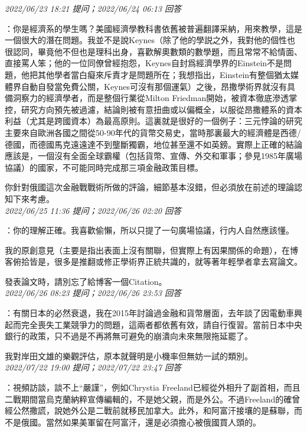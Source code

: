 \documentclass[twocolumn]{ctexart}
\begin{document}
\textit{\hfill\noindent\small 2022/06/23 18:21 提问；2022/06/24 06:13 回答}

：你是經濟系的學生嗎？美國經濟學教科書依舊被普遍翻譯采納，用來教學，這是一個很大的潛在問題。我並不是說Keynes（除了他的學説之外，我對他的個性也很認同，畢竟他不但也是理科出身，喜歡解奧數類的數學題，而且常常不給情面、直接罵人笨；他的一位同僚曾經抱怨，Keynes自封爲經濟學界的Einstein不是問題，他把其他學者當白癡來斥責才是問題所在；我想指出，Einstein有整個猶太媒體界自動自發當免費公關，Keynes可沒有那個運氣）之後，昂撒學術界就沒有具備洞察力的經濟學者，而是整個行業從Milton Friedman開始，被資本徹底滲透掌控，研究方向預先被過濾，結論則被有意扭曲或以偏概全，以服從昂撒體系的資本利益（尤其是跨國資本）為最高原則。這裏就是很好的一個例子：三元悖論的研究主要來自歐洲各國之間從50-90年代的貨幣交易史，當時那裏最大的經濟體是西德/德國，而德國馬克遠遠達不到壟斷獨霸，地位甚至還不如英鎊。實際上正確的結論應該是，一個沒有全面全球霸權（包括貨幣、宣傳、外交和軍事；參見1985年廣場協議）的國家，不可能同時完成那三項金融政策目標。

你針對俄國這次金融戰戰術所做的評論，細節基本沒錯，但必須放在前述的理論認知下來考慮。
\\

\textit{\hfill\noindent\small 2022/06/25 11:36 提问；2022/06/26 02:20 回答}

：你的理解正確。我喜歡偷懶，所以只提了一句廣場協議，行内人自然應該懂。

我的原創意見（主要是指出表面上沒有關聯，但實際上有因果關係的命題），在博客俯拾皆是，很多是推翻或修正學術界正統共識的，就等著年輕學者拿去寫論文。

發表論文時，請別忘了給博客一個Citation。
\\

\textit{\hfill\noindent\small 2022/06/26 08:23 提问；2022/06/26 23:53 回答}

：有關日本的必然衰退，我在2015年討論過金融和貨幣層面，去年談了因電動車興起而完全喪失工業競爭力的問題，這兩者都依舊有效，請自行復習。當前日本中央銀行的政策，只不過是不再將無可避免的崩潰向未來無限拖延罷了。

我對岸田文雄的樂觀評估，原本就聲明是小機率但無妨一試的類別。
\\

\textit{\hfill\noindent\small 2022/07/22 19:00 提问；2022/07/22 23:47 回答}

：視頻訪談，談不上“嚴謹”，例如Chrystia Freeland已經從外相升了副首相，而且二戰期間當烏克蘭納粹宣傳編輯的，不是她父親，而是外公。不過Freeland的確曾經公然撒謊，說她外公是二戰前就移民加拿大。此外，和阿富汗接壤的是蘇聯，而不是俄國。當然如果美軍留在阿富汗，還是必須擔心被俄國買人頭的。
\end{document}
